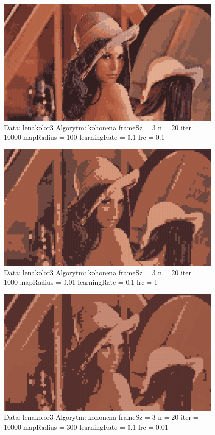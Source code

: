 \documentclass{classrep}
\begin{document}
{{{\newpage

\begin{figure}[h!]
\centering
 \includegraphics[width=12cm]{img/kohonen_4.png}
 \vspace{-0.0cm}
 \caption{Data: lenakolor3 Algorytm: kohonena frameSz = 3 n = 20 iter = 10000 mapRadius = 100 learningRate = 0.1 lrc = 0.1
}
\end{figure}

\begin{figure}[h!]
\centering
 \includegraphics[width=12cm]{img/kohonen_5.png}
 \vspace{-0.0cm}
 \caption{Data: lenakolor3 Algorytm: kohonena frameSz = 3 n = 20 iter = 1000 mapRadius = 0.01 learningRate = 0.1 lrc = 1
}
\end{figure}

\newpage

\begin{figure}[h!]
\centering
 \includegraphics[width=12cm]{img/kohonen_6.png}
 \vspace{-0.0cm}
 \caption{Data: lenakolor3 Algorytm: kohonena frameSz = 3 n = 20 iter = 10000 mapRadius = 300 learningRate = 0.1 lrc = 0.01
}
\end{figure}

}}}
\end{document}
